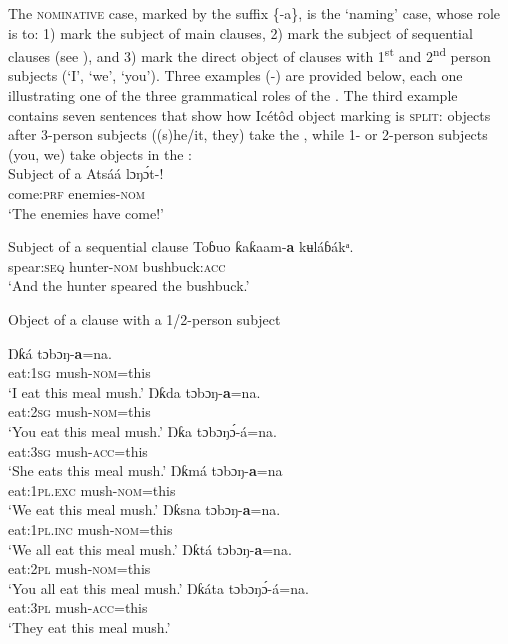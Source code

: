 The \textsc{nominative} case, marked by the suffix \{-a\}, is the ‘naming’ case, whose role is to: 1) mark the subject of main clauses, 2) mark the subject of sequential clauses (see ), and 3) mark the direct object of clauses with 1\textsuperscript{st} and 2\textsuperscript{nd} person subjects (‘I’, ‘we’, ‘you’). Three examples (-) are provided below, each one illustrating one of the three grammatical roles of the . The third example contains seven sentences that show how Icétôd object marking is \textsc{split}: objects after 3-person subjects ((s)he/it, they) take the , while 1- or 2-person subjects (you, we) take objects in the :\\




Subject of a 
\ea\label{ex:case:9}
\gll Atsáá   lɔŋ\'{ɔ}t-\textbf{\ᵃ}! \\
come:\textsc{prf}   enemies-\textsc{nom}    \\
\glt ‘The enemies have come!’ 
\z




Subject of a sequential clause
\ea\label{ex:case:10}
\gll Toɓuo   ƙaƙaam-\textbf{a}   kʉláɓákᵃ. \\
spear:\textsc{seq}   hunter-\textsc{nom}   bushbuck:\textsc{acc}    \\
\glt ‘And the hunter speared the bushbuck.’ 
\z




Object of a clause with a 1/2-person subject




\ea\label{ex:case:11}
  \ea
  \gll Ŋƙ{\Í}á   tɔbɔŋ-\textbf{a}=na. \\
eat:\textsc{1sg}   mush-\textsc{nom}=this    \\   
  \glt ‘I eat this meal mush.’
  \ex
  \gll Ŋƙ{\Í}da   tɔbɔŋ-\textbf{a}=na. \\
eat:\textsc{2sg}   mush-\textsc{nom}=this    \\
  \glt ‘You eat this meal mush.’
  \ex
  \gll Ŋƙa   tɔbɔŋ\'{ɔ}-á=na. \\
eat:\textsc{3sg}   mush-\textsc{acc}=this    \\
  \glt ‘She eats this meal mush.’
  \ex
  \gll Ŋƙ{\Í}má     tɔbɔŋ-\textbf{a}=na \\
eat:\textsc{1pl.exc}   mush-\textsc{nom}=this    \\
  \glt ‘We eat this meal mush.’
  \ex
  \gll Ŋƙ{\Í}s{\Í}na     tɔbɔŋ-\textbf{a}=na. \\
eat:\textsc{1pl.inc}   mush-\textsc{nom}=this    \\
  \glt ‘We all eat this meal mush.’
  \ex
  \gll Ŋƙ{\Í}tá   tɔbɔŋ-\textbf{a}=na. \\
eat:\textsc{2pl}   mush-\textsc{nom}=this    \\
  \glt ‘You all eat this meal mush.’
  \ex
  \gll Ŋƙáta   tɔbɔŋ\'{ɔ}-á=na. \\
  eat:\textsc{3pl}   mush-\textsc{acc}=this    \\
  \glt ‘They eat this meal mush.’

